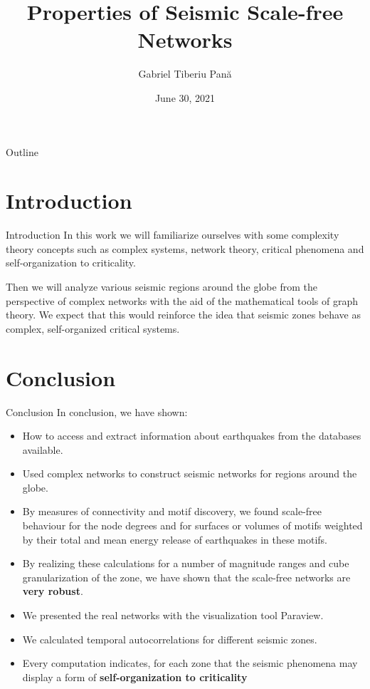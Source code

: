 \documentclass[10pt]{beamer}
\date{June 30, 2021}
\title{Properties of Seismic Scale-free Networks}
\author{Gabriel Tiberiu Pan\u{a}}
\institute{Theoretical and Computational Physics}
\begin{document}
{
\begin{frame}
	\titlepage
\end{frame}
}
	
\begin{frame}{Outline}
	\tableofcontents
\end{frame}


\section{Introduction}
\begin{frame}{Introduction}
In this work we will familiarize ourselves with some complexity theory concepts such as complex systems, network theory, critical phenomena and self-organization to criticality.\par

\vspace{5mm} 

Then we will analyze various seismic regions around the globe from the perspective of complex networks with the aid of the mathematical tools of graph theory. We expect that this would reinforce the idea that seismic zones behave as complex, self-organized critical systems.\par 
\end{frame}









\section{Conclusion}
\begin{frame}{Conclusion}
In conclusion, we have shown:
\begin{itemize}
	\item How to access and extract information about earthquakes from the databases available.
	\item Used complex networks to construct seismic networks for regions around the globe.
	\item By measures of connectivity and motif discovery, we found scale-free behaviour for the node degrees and for surfaces or volumes of motifs weighted by their total and mean energy release of earthquakes in these motifs.
	\item By realizing these calculations for a number of magnitude ranges and cube granularization of the zone, we have shown that the scale-free networks are {\bf very robust}.
	\item We presented the real networks with the visualization tool Paraview.
	\item We calculated temporal autocorrelations for different seismic zones.
	\item Every computation indicates, for each zone that the seismic phenomena may display a form of {\bf self-organization to criticality}
\end{itemize}
\end{frame}
\end{document}
